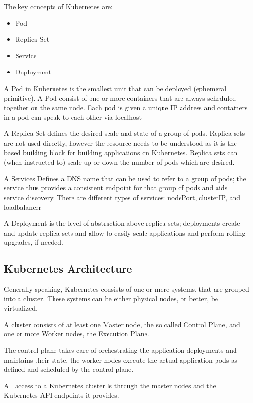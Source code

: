 The key concepts of Kubernetes are:
\begin{itemize}
\item Pod
\item Replica Set
\item Service
\item Deployment
\end{itemize}

A Pod in Kubernetes is the smallest unit that can be deployed (ephemeral primitive). A Pod consist of one or more containers that are always scheduled together on the same node. Each pod is given a unique IP address and containers in a pod can speak to each other via localhost

A Replica Set defines the desired scale and state of a group of pods. Replica sets are not used directly, however the resource needs to be understood as it is the based building block for building applications on Kubernetes. Replica sets can (when instructed to) scale up or down the number of pods which are desired.

A Services Defines a DNS name that can be used to refer to a group of pods; the service thus provides a consistent endpoint for that group of pods and aids service discovery. There are different types of services: nodePort, clusterIP, and loadbalancer

A Deployment is the level of abstraction above replica sets; deployments create and update replica sets and allow to easily scale applications and perform rolling upgrades, if needed.

\subsection{Kubernetes Architecture}

Generally speaking, Kubernetes consists of one or more systems, that are grouped into a cluster. These systems can be either physical nodes, or better, be virtualized.

A cluster consists of at least one Master node, the so called Control Plane, and one or more Worker nodes, the Execution Plane.

The control plane takes care of orchestrating the application deployments and maintains their state, the worker nodes execute the actual application pods as defined and scheduled by the control plane.

All access to a Kubernetes cluster is through the master nodes and the Kubernetes API endpoints it provides.
